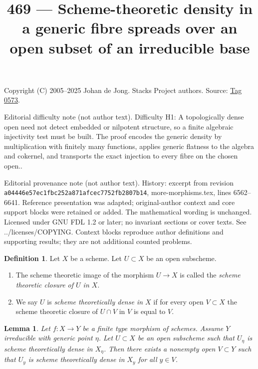 \documentclass{amsart}
\theoremstyle{plain}
\newtheorem{lemma}[subsection]{Lemma}
\theoremstyle{definition}
\newtheorem{definition}[subsection]{Definition}
\theoremstyle{remark}
\numberwithin{equation}{subsection}
\begin{document}
\title[Stacks Project, Tag 0573]{469 --- Scheme-theoretic density in a generic fibre spreads over an open subset of an irreducible base}
\maketitle
\noindent Copyright (C) 2005--2025 Johan de Jong. Stacks Project authors. Source: \href{https://stacks.math.columbia.edu/tag/0573}{Tag 0573}.

\noindent Editorial difficulty note (not author text). Difficulty H1: A topologically dense open need not detect embedded or nilpotent structure, so a finite algebraic injectivity test must be built. The proof encodes the generic density by multiplication with finitely many functions, applies generic flatness to the algebra and cokernel, and transports the exact injection to every fibre on the chosen open..

\noindent Editorial provenance note (not author text). History: excerpt from revision \texttt{a0444\allowbreak 6e57e\allowbreak c1fbc\allowbreak 252a8\allowbreak 71afc\allowbreak ec775\allowbreak 2fb28\allowbreak 07b14}, more-morphisms.tex, lines 6562--6641. Reference presentation was adapted; original-author context and core support blocks were retained or added. The mathematical wording is unchanged. Licensed under GNU FDL 1.2 or later; no invariant sections or cover texts. See ../licenses/COPYING. Context blocks reproduce author definitions and supporting results; they are not additional counted problems.

\begin{definition}
\label{morphisms-definition-scheme-theoretically-dense}
Let $X$ be a scheme. Let $U \subset X$ be an open subscheme.
\begin{enumerate}
\item The scheme theoretic image of the morphism $U \to X$
is called the {\it scheme theoretic closure of $U$ in $X$}.
\item We say $U$ is {\it scheme theoretically dense in $X$}
if for every open $V \subset X$ the scheme theoretic closure
of $U \cap V$ in $V$ is equal to $V$.
\end{enumerate}
\end{definition}

\begin{lemma}
\label{lemma-scheme-theoretically-dense-generic-fibre}
Let $f : X \to Y$ be a finite type morphism of schemes.
Assume $Y$ irreducible with generic point $\eta$.
Let $U \subset X$ be an open subscheme such that $U_\eta$ is
scheme theoretically dense in $X_\eta$.
Then there exists a nonempty open $V \subset Y$ such
that $U_y$ is scheme theoretically dense in $X_y$ for all $y \in V$.
\end{lemma}
\end{document}
